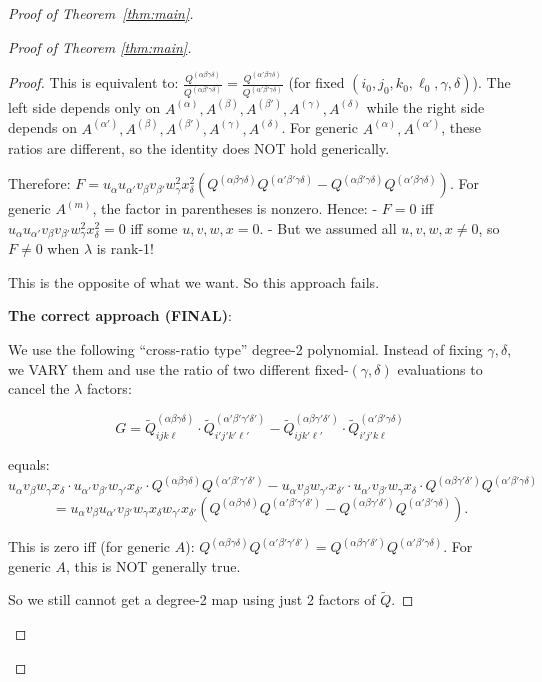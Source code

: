 \documentclass[12pt]{article}
\theoremstyle{definition}
\begin{document}
\begin{proof}[Proof of Theorem~\ref{thm:main}]
\begin{proof}[Proof of Theorem \ref{thm:main}]
\begin{proof}
This is equivalent to: $\frac{Q^{(\alpha\beta\gamma\delta)}}{Q^{(\alpha\beta'\gamma\delta)}} = \frac{Q^{(\alpha'\beta\gamma\delta)}}{Q^{(\alpha'\beta'\gamma\delta)}}$ (for fixed $(i_0,j_0,k_0,\ell_0,\gamma,\delta)$). The left side depends only on $A^{(\alpha)},A^{(\beta)},A^{(\beta')},A^{(\gamma)},A^{(\delta)}$ while the right side depends on $A^{(\alpha')},A^{(\beta)},A^{(\beta')},A^{(\gamma)},A^{(\delta)}$. For generic $A^{(\alpha)},A^{(\alpha')}$, these ratios are different, so the identity does NOT hold generically.

Therefore: $F = u_\alpha u_{\alpha'}v_\beta v_{\beta'}w_\gamma^2 x_\delta^2 (Q^{(\alpha\beta\gamma\delta)}Q^{(\alpha'\beta'\gamma\delta)} - Q^{(\alpha\beta'\gamma\delta)}Q^{(\alpha'\beta\gamma\delta)})$. For generic $A^{(m)}$, the factor in parentheses is nonzero. Hence:
- $F = 0$ iff $u_\alpha u_{\alpha'}v_\beta v_{\beta'}w_\gamma^2 x_\delta^2 = 0$ iff some $u,v,w,x = 0$.
- But we assumed all $u,v,w,x\neq 0$, so $F\neq 0$ when $\lambda$ is rank-1!

This is the opposite of what we want. So this approach fails.

\textbf{The correct approach (FINAL)}:

We use the following ``cross-ratio type'' degree-2 polynomial. Instead of fixing $\gamma,\delta$, we VARY them and use the ratio of two different fixed-$(\gamma,\delta)$ evaluations to cancel the $\lambda$ factors:

$$G = \tilde{Q}^{(\alpha\beta\gamma\delta)}_{ijk\ell}\cdot\tilde{Q}^{(\alpha'\beta'\gamma'\delta')}_{i'j'k'\ell'} - \tilde{Q}^{(\alpha\beta\gamma'\delta')}_{ijk'\ell'}\cdot\tilde{Q}^{(\alpha'\beta'\gamma\delta)}_{i'j'k\ell}$$

equals:
$$u_\alpha v_\beta w_\gamma x_\delta\cdot u_{\alpha'}v_{\beta'}w_{\gamma'}x_{\delta'}\cdot Q^{(\alpha\beta\gamma\delta)}Q^{(\alpha'\beta'\gamma'\delta')} - u_\alpha v_\beta w_{\gamma'}x_{\delta'}\cdot u_{\alpha'}v_{\beta'}w_\gamma x_\delta\cdot Q^{(\alpha\beta\gamma'\delta')}Q^{(\alpha'\beta'\gamma\delta)}$$
$$= u_\alpha v_\beta u_{\alpha'}v_{\beta'}w_\gamma x_\delta w_{\gamma'}x_{\delta'}(Q^{(\alpha\beta\gamma\delta)}Q^{(\alpha'\beta'\gamma'\delta')} - Q^{(\alpha\beta\gamma'\delta')}Q^{(\alpha'\beta'\gamma\delta)}).$$

This is zero iff (for generic $A$): $Q^{(\alpha\beta\gamma\delta)}Q^{(\alpha'\beta'\gamma'\delta')} = Q^{(\alpha\beta\gamma'\delta')}Q^{(\alpha'\beta'\gamma\delta)}$. For generic $A$, this is NOT generally true.

So we still cannot get a degree-2 map using just 2 factors of $\tilde{Q}$.


\end{proof}
\end{proof}
\end{proof}
\end{document}

